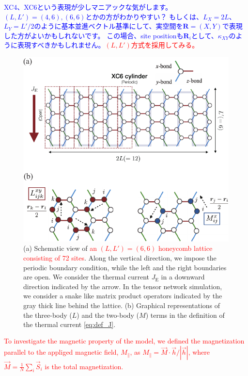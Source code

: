 \documentclass[reprint,amsmath,amssymb,aps,prx]{revtex4-2}
\newcommand{\red}[1]{\textcolor{red}{#1}}
\newcommand{\blue}[1]{\textcolor{blue}{#1}}
\begin{document}
\blue{XC4、XC6という表現が少しマニアックな気がします。$(L,L')=(4,6),(6,6)$とかの方がわかりやすい？
もしくは、$L_X=2L$、$L_Y=L'/2$のように基本並進ベクトル基準にして、実空間を$\bm{R}=(X,Y)$で表現した方がよいかもしれないです。
この場合、site positionも$\bm{R}_i$として、$\kappa_{XY}$のように表現すべきかもしれません。}\red{$(L,L')$方式を採用してみる。}

\begin{figure}
  \begin{center}
    \includegraphics[width=\linewidth]{Figs/lattice.pdf}
  \end{center}
  \caption{(a) Schematic view of \red{an $(L, L') = (6, 6) $ honeycomb lattice consisting of 72 sites}. Along the vertical direction, we impose the periodic boundary condition, while the left and the right boundaries are open. We consider the thermal current $J_{\mathrm{E}}$ in a downward direction indicated by the arrow. In the tensor network simulation, we consider a snake like matrix product operators indicated by the gray thick line behind the lattice. (b) Graphical representations of the three-body ($L$) and the two-body ($M$) terms in the definition of the thermal current \eqref{eq:def_J}.}
  \label{fig:lattice}
\end{figure}

\red{To investigate the magnetic property of the model, we defined the magnetization parallel to the appliged magnetic field, $M_{\parallel}$, as $M_\parallel=\vec{M}\cdot\vec{h}/|\vec{h}|$, where $\vec{M} = \frac{1}{N}\sum_i \vec{S}_i$ is the total magnetization.}
\end{document}
